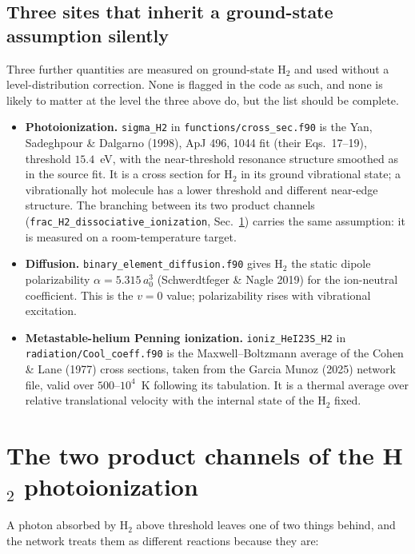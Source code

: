 \documentclass[english,a4paper]{my_memo}
\begin{document}
\subsection{Three sites that inherit a ground-state assumption silently}

Three further quantities are measured on ground-state H$_2$ and used without
a level-distribution correction. None is flagged in the code as such, and
none is likely to matter at the level the three above do, but the list should
be complete.

\begin{itemize}
\item \textbf{Photoionization.} \texttt{sigma\_H2} in
  \texttt{functions/cross\_sec.f90} is the Yan, Sadeghpour \& Dalgarno (1998),
  ApJ 496, 1044 fit (their Eqs.\ 17--19), threshold $15.4$~eV, with the
  near-threshold resonance structure smoothed as in the source fit. It is a
  cross section for H$_2$ in its ground vibrational state; a vibrationally hot
  molecule has a lower threshold and different near-edge structure. The
  branching between its two product channels
  (\texttt{frac\_\allowbreak H2\_\allowbreak dissociative\_\allowbreak ionization}, Sec.~\ref{sec:h2-photo-branch})
  carries the same assumption: it is measured on a room-temperature target.
\item \textbf{Diffusion.} \texttt{binary\_element\_diffusion.f90} gives H$_2$
  the static dipole polarizability $\alpha = 5.315\,a_0^3$
  (Schwerdtfeger \& Nagle 2019) for the ion-neutral coefficient. This is the
  $v=0$ value; polarizability rises with vibrational excitation.
\item \textbf{Metastable-helium Penning ionization.}
  \texttt{ioniz\_HeI23S\_H2} in \texttt{radiation/Cool\_coeff.f90} is the
  Maxwell--Boltzmann average of the Cohen \& Lane (1977) cross sections, taken
  from the Garcia Munoz (2025) network file, valid over $500$--$10^4$~K
  following its tabulation. It is a thermal average over relative translational
  velocity with the internal state of the H$_2$ fixed.
\end{itemize}

\section{The two product channels of the H$_2$ photoionization}
\label{sec:h2-photo-branch}

A photon absorbed by H$_2$ above threshold leaves one of two things behind,
and the network treats them as different reactions because they are:
\end{document}
